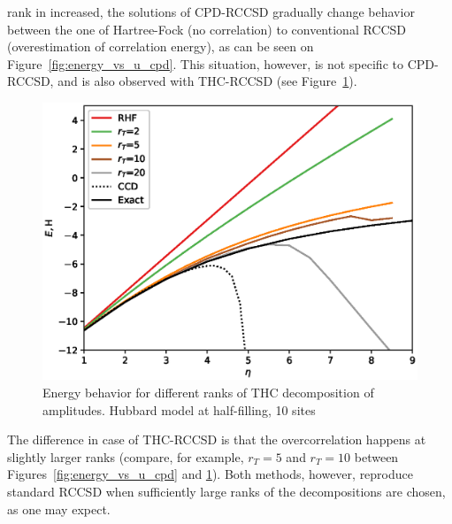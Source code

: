 rank in increased, the solutions of CPD-RCCSD gradually change behavior between 
the one of Hartree-Fock (no correlation) to conventional RCCSD 
(overestimation of correlation energy), as can be seen on 
Figure~\ref{fig:energy_vs_u_cpd}. This situation, however, is not 
specific to CPD-RCCSD, and is also observed with THC-RCCSD (see 
Figure~\ref{fig:energy_vs_u_thc}).
%
\begin{figure}[ht!]
\centering
\includegraphics[width=\columnwidth]
{figures/tcc_strong_correlation/energy_vs_u_10_sites_thc_rccsd}
\caption{Energy behavior for different ranks of THC decomposition of 
amplitudes. Hubbard model at half-filling, 10 sites}
\label{fig:energy_vs_u_thc}
\end{figure}
%
The difference in case of THC-RCCSD is that the overcorrelation happens at 
slightly larger ranks (compare, for example, $r_{T} = 5$ and $r_{T} = 10$ 
between Figures~\ref{fig:energy_vs_u_cpd} and \ref{fig:energy_vs_u_thc}). Both 
methods, however, reproduce standard RCCSD when sufficiently large ranks of the 
decompositions are chosen, as one may expect.

